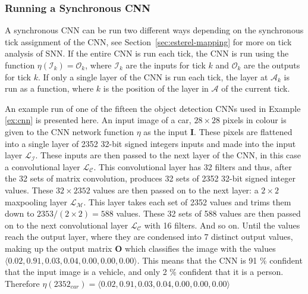 \subsubsection{Running a Synchronous CNN}
A synchronous CNN can be run two different ways depending on the synchronous tick assignment of the CNN, see Section~\ref{sec:esterel-mapping} for more on tick analysis of \ac{SNN}. 
If the entire CNN is run each tick, the CNN is run using the function $\eta(\mathcal{I}_k) = \mathcal{O}_k$, where $\mathcal{I}_k$ are the inputs for tick $k$ and $\mathcal{O}_k$ are the outputs for tick $k$.
If only a single layer of the CNN is run each tick, the layer at $\mathcal{A}_k$ is run as a function, where $k$ is the position of the layer in $\mathcal{A}$ of the current tick.

\begin{example}
	\label{ex:runcnn}
	An example run of one of the fifteen the object detection \acp{CNN} used in Example \ref{ex:cnn} is presented here.
	An input image of a car, $28 \times 28$ pixels in colour is given to the \ac{CNN} network function $\eta$ as the input \textbf{I}.
	These pixels are flattened into a single layer of 2352 32-bit signed integers inputs and made into the input layer $\mathcal{L}_\mathcal{I}$.
	These inputs are then passed to the next layer of the \ac{CNN}, in this case a convolutional layer $\mathcal{L}_\mathcal{C}$.
	This convolutional layer has 32 filters and thus, after the 32 sets of matrix convolution, produces 32 sets of 2352 32-bit signed integer values.
	These $32 \times 2352$ values are then passed on to the next layer: a $2 \times 2$ maxpooling layer $\mathcal{L}_\mathcal{M}$.
	This layer takes each set of 2352 values and trims them down to $2353 / (2 \times 2) = 588$ values.
	These 32 sets of 588 values are then passed on to the next convolutional layer $\mathcal{L}_\mathcal{C}$ with 16 filters.
	And so on.
	Until the values reach the output layer, where they are condensed into 7 distinct output values, making up the output matrix \textbf{O} which classifies the image with the values $\langle 0.02, 0.91, 0.03, 0.04, 0.00, 0.00, 0.00 \rangle$.
	This means that the \ac{CNN} is 91 \% confident that the input image is a vehicle, and only 2 \% confident that it is a person.
	Therefore $\eta(2352_{car}) = \langle 0.02, 0.91, 0.03, 0.04, 0.00, 0.00, 0.00 \rangle$
\end{example}

